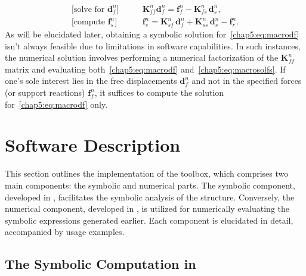 %
\begin{subequations}
  \label{chap5:eq:macrosol}
  \begin{align}
    \textrm{[solve for $\mathbf{d}^{n}_{f}$]} \qquad &\mathbf{K}^{n}_{ff}\mathbf{d}^{n}_{f} = \mathbf{f}^{n}_{f} - \mathbf{K}^{n}_{fs}\,\mathbf{d}^{n}_{s} \label{chap5:eq:macrodf} \text{,} \\
    \textrm{[compute $\mathbf{f}^{n}_{s}$]} \qquad &\mathbf{f}^{n}_{s} = \mathbf{K}^{n}_{sf}\,\mathbf{d}^{n}_{f} + \mathbf{K}^{n}_{ss}\,\mathbf{d}^{n}_{s} - \mathbf{f}^{n}_{r} \text{.} \label{chap5:eq:macrosolfs}
  \end{align}
\end{subequations}
%
As will be elucidated later, obtaining a symbolic solution for~\eqref{chap5:eq:macrodf} isn't always feasible due to limitations in software capabilities. In such instances, the numerical solution involves performing a numerical factorization of the $\mathbf{K}^{n}_{ff}$ matrix and evaluating both~\eqref{chap5:eq:macrodf} and~\eqref{chap5:eq:macrosolfs}. If one's sole interest lies in the free displacements $\mathbf{d}^{n}_{f}$ and not in the specified forces (or support reactions) $\mathbf{f}^{n}_{f}$, it suffices to compute the solution for~\eqref{chap5:eq:macrodf} only.


\section{Software Description}
\label{chap5:sec:software_description}

This section outlines the implementation of the \TrussMe{} toolbox, which comprises two main components: the symbolic and numerical parts. The symbolic component, developed in \Maple{}, facilitates the symbolic analysis of the structure. Conversely, the numerical component, developed in \Matlab{}, is utilized for numerically evaluating the symbolic expressions generated earlier. Each component is elucidated in detail, accompanied by usage examples.

\subsection{The Symbolic Computation in \Maple{}}
\label{chap5:subsec:symbolic_computation}

